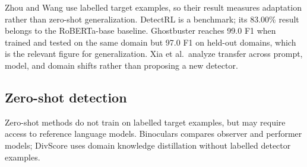 \documentclass[11pt]{article}
\begin{document}
Zhou and Wang use labelled target examples, so their result measures adaptation rather than zero-shot generalization. DetectRL is a benchmark; its 83.00\% result belongs to the RoBERTa-base baseline. Ghostbuster reaches 99.0 F1 when trained and tested on the same domain but 97.0 F1 on held-out domains, which is the relevant figure for generalization. Xia et al.\ analyze transfer across prompt, model, and domain shifts rather than proposing a new detector.

\subsection{Zero-shot detection}
Zero-shot methods do not train on labelled target examples, but may require access to reference language models. Binoculars compares observer and performer models; DivScore uses domain knowledge distillation without labelled detector examples.
\end{document}

